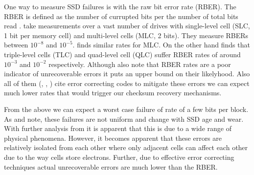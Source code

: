         One way to measure SSD failures is with the raw bit error rate (RBER).
        The RBER is defined as the number of currupted bits per the number of
        total bits read \cite{flash_reliability}.
        \citeauthor{flash_reliability} take measurements over a vast number of
        drives with single-level cell (SLC, 1 bit per memory cell) and
        multi-level cells (MLC, 2 bits). They measure RBERs between $10^{-8}$
        and $10^{-5}$. \citeauthor{bit_error_mlc} finds similar rates for MLC.
        On the other hand \citeauthor{bit_error_qlc} finds that triple-level
        cells (TLC) and quad-level cell (QLC) suffer RBER rates of around
        $10^{-3}$ and $10^{-2}$ respectively. Although
        \citeauthor{flash_reliability} also note that RBER rates are a poor
        indicator of unrecoverable errors it puts an upper bound on their
        likelyhood. Also all of them (\cite{flash_reliability},
        \cite{bit_error_mlc}, \cite{bit_error_qlc}) cite error correcting codes
        to mitigate these errors we can expect much lower rates that would
        trigger our checksum recovery mechanisms.


        From the above we can expect a worst case failure of rate of a few bits
        per block. As \citeauthor{flash_reliability} and
        \citeauthor{flash_large_scale} note, these failures are not uniform and
        change with SSD age and wear. With further analysis from
        \citeauthor{flash_error_manual} it is apparent that this is due to a
        wide range of physical phenomena. However, it becomes apparent that
        these errors are relatively isolated from each other where only
        adjacent cells can affect each other due to the way cells store
        electrons. Further, due to effective error correcting techniques actual
        unrecoverable errors are much lower than the RBER.

